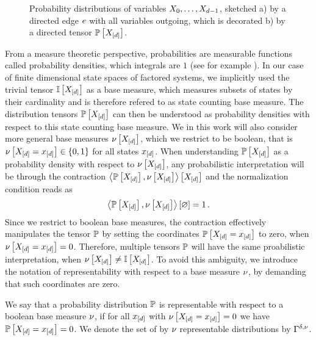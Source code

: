 \begin{figure}[hbt!]
    \begin{center}
        
    \end{center}
    \caption{Probability distributions of variables $X_{0},\ldots,X_{d-1}$, sketched
    a) by a directed edge $e$ with all variables outgoing, which is decorated b) by a directed tensor $\mathbb{P}\left[X_{[d]}\right]$.}\label{fig:probabilityTensor}
\end{figure}


\label{sec:baseMeasure}

From a measure theoretic perspective, probabilities are measurable functions called probability densities, which integrals are $1$ (see for example \cite{degroot_probability_2016}). %
In our case of finite dimensional state spaces of factored systems, we implicitly used the trivial tensor $\mathbb{I}\left[X_{[d]}\right]$ as a base measure, which measures subsets of states by their cardinality and is therefore refered to as state counting base measure.
The distribution tensors $\mathbb{P}\left[X_{[d]}\right]$ can then be understood as probability densities with respect to this state counting base measure.
We in this work will also consider more general base measures $\nu\left[X_{[d]}\right]$, which we restrict to be boolean, that is $\nu\left[X_{[d]}=x_{[d]}\right]\in\{0,1\}$ for all states $x_{[d]}$.
When understanding $\mathbb{P}\left[X_{[d]}\right]$ as a probability density with respect to $\nu\left[X_{[d]}\right]$, any probabilistic interpretation will be through the contraction $\left\langle \mathbb{P}\left[X_{[d]}\right],\nu\left[X_{[d]}\right]\right\rangle \left[ X_{[d]} \right]$ and the normalization condition reads as
\begin{align*}
    \left\langle \mathbb{P}\left[X_{[d]}\right],\nu\left[X_{[d]}\right]\right\rangle \left[ \varnothing \right] = 1 \, .
\end{align*}
Since we restrict to boolean base measures, the contraction effectively manipulates the tensor $\mathbb{P}$ by setting the coordinates $\mathbb{P}\left[X_{[d]}=x_{[d]}\right]$ to zero, when $\nu\left[X_{[d]}=x_{[d]}\right]=0$.
Therefore, multiple tensors $\mathbb{P}$ will have the same proabilistic interpretation, when $\nu\left[X_{[d]}\right]\neq\mathbb{I}\left[X_{[d]}\right]$.
To avoid this ambiguity, we introduce the notation of representability with respect to a base measure $\nu$, by demanding that such coordinates are zero.

\begin{definition}
    \label{def:representationBaseMeasure}
    We say that a probability distribution $\mathbb{P}$ is representable with respect to a boolean base measure $\nu$, if for all $x_{[d]}$ with $\nu\left[X_{[d]}=x_{[d]}\right]=0$ we have $\mathbb{P}\left[X_{[d]}=x_{[d]}\right]=0$.
    We denote the set of by $\nu$ representable distributions by $\Gamma^{\delta,\nu}$.
\end{definition}

